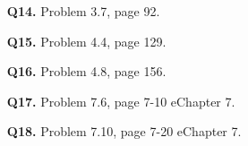 \documentclass[12pt]{article}
\begin{document}
\begin{enumerate}
\item [\textbf{Q14.}] Problem 3.7, page 92.

\item [\textbf{Q15.}] Problem 4.4, page 129.

\item [\textbf{Q16.}] Problem 4.8, page 156.

\item [\textbf{Q17.}] Problem 7.6, page 7-10 eChapter 7.

\item [\textbf{Q18.}] Problem 7.10, page 7-20 eChapter 7.
\end{enumerate}
\end{document}
